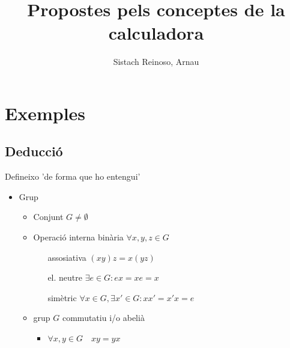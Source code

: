 \documentclass{article}
\title{Propostes pels conceptes de la calculadora}
\author{Sistach Reinoso, Arnau}
\begin{document}
\maketitle
\tableofcontents

\section{Exemples}
\subsection{Deducció}
Defineixo 'de forma que ho entengui'
\begin{itemize}
\item Grup
	\begin{itemize}
	\item Conjunt $G \neq \emptyset$
	\item Operació interna binària $\forall x, y, z \in G$
		\begin{enumerate}
		\item[assosiativa] $(xy)z = x(yz) $
		\item[el. neutre] $\exists e \in G: ex = xe = x$
		\item[simètric] $\forall x \in G, \exists x' \in G: xx' = x'x = e$
		\end{enumerate}
	\item grup $G$ commutatiu i/o abelià
		\begin{itemize}
		\item $\forall x, y \in G\quad xy = yx$
		\end{itemize}
	\end{itemize}
\end{itemize}
\end{document}
